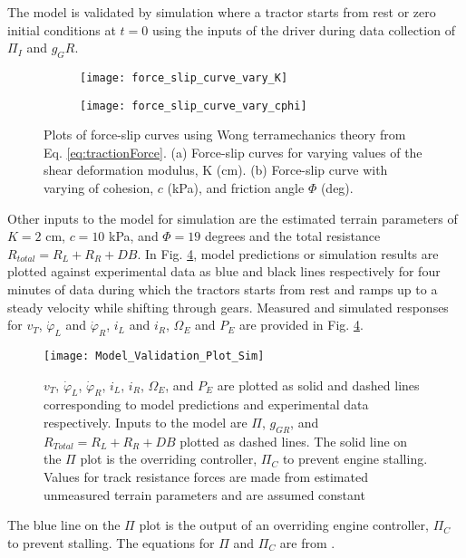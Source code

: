 The model is validated by simulation where a tractor starts from rest or zero initial conditions at $t = 0$ using the inputs of the driver during data collection of $\Pi_I$ and $g_GR$.
\begin{figure}[hb]
\begin{subfigure}{0.5\textwidth}
\texttt{[image: force\_slip\_curve\_vary\_K]}
\caption{}
\label{fig:force_slip_curve_vary_K}
\end{subfigure}
\begin{subfigure}{0.525\textwidth}
\texttt{[image: force\_slip\_curve\_vary\_cphi]}
\caption{}
\label{fig:force_slip_curve_vary_cphi}
\end{subfigure}
\caption{Plots of force-slip curves using Wong terramechanics theory from Eq. \ref{eq:tractionForce}. (a) Force-slip curves for varying values of the shear deformation modulus, K (cm).  (b) Force-slip curve with varying of cohesion, $c$ (kPa), and friction angle $\Phi$ (deg).}
\label{fig:force_slip_curve}
\end{figure}
Other inputs to the model for simulation are the estimated terrain parameters of $K=2$ cm, $c = 10$ kPa, and $\Phi=19$ degrees and the total resistance $R_{total} = R_L + R_R + DB$. In Fig. \ref{fig:Model_Validation_Plot_Sim}, model predictions or simulation results are plotted against experimental data as blue and black lines respectively for four minutes of data during which the tractors starts from rest and ramps up to a steady velocity while shifting through gears. Measured and simulated responses for $v_T$, $\dot\varphi_L$ and $\dot\varphi_R$, $i_L$ and $i_R$, $\Omega_E$ and $P_E$ are provided in Fig. \ref{fig:Model_Validation_Plot_Sim}. 
\begin{figure}[hb]
    \centering
    \texttt{[image: Model\_Validation\_Plot\_Sim]}
    \caption{$v_T$, $\dot\varphi_L$, $\dot\varphi_R$, $i_L$, $i_R$, $\Omega_E$, and $P_E$ are plotted as solid and dashed lines corresponding to model predictions and experimental data respectively. Inputs to the model are $\Pi$, $g_{GR}$, and $R_{Total} = R_L + R_R + DB$ plotted as dashed lines. The solid line on the $\Pi$ plot is the overriding controller, $\Pi_C$ to prevent engine stalling. Values for track resistance forces are made from estimated unmeasured terrain parameters and are assumed constant}
    \label{fig:Model_Validation_Plot_Sim}
\end{figure}
The blue line on the $\Pi$ plot is the output of an overriding engine controller, $\Pi_C$ to prevent stalling. The equations for $\Pi$ and $\Pi_C$ are from \cite{MathWorks2015GenericEngine}.

